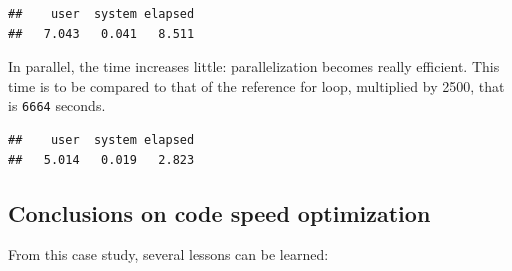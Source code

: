 \documentclass[
  12pt,
  american,
  a4paper,
  extrafontsizes,onecolumn,openright
  ]{memoir}
\newenvironment{Shaded}{\begin{snugshade}}{\end{snugshade}}
\newcommand{\DecValTok}[1]{\textcolor[rgb]{0.00,0.00,0.81}{#1}}
\newcommand{\FunctionTok}[1]{\textcolor[rgb]{0.00,0.00,0.00}{#1}}
\newcommand{\NormalTok}[1]{#1}
\newcommand{\OtherTok}[1]{\textcolor[rgb]{0.56,0.35,0.01}{#1}}
\newcommand{\SpecialCharTok}[1]{\textcolor[rgb]{0.00,0.00,0.00}{#1}}
\begin{document}
\scriptsize

\begin{Shaded}
\end{Shaded}

\begin{verbatim}
##    user  system elapsed 
##   7.043   0.041   8.511
\end{verbatim}

\normalsize

In parallel, the time increases little: parallelization becomes really efficient.
This time is to be compared to that of the reference for loop, multiplied by 2500, that is \texttt{6664} seconds.

\scriptsize

\begin{Shaded}
\end{Shaded}

\begin{verbatim}
##    user  system elapsed 
##   5.014   0.019   2.823
\end{verbatim}

\normalsize

\hypertarget{conclusions-on-code-speed-optimization}{%
\subsection{Conclusions on code speed optimization}\label{conclusions-on-code-speed-optimization}}

From this case study, several lessons can be learned:
\end{document}
